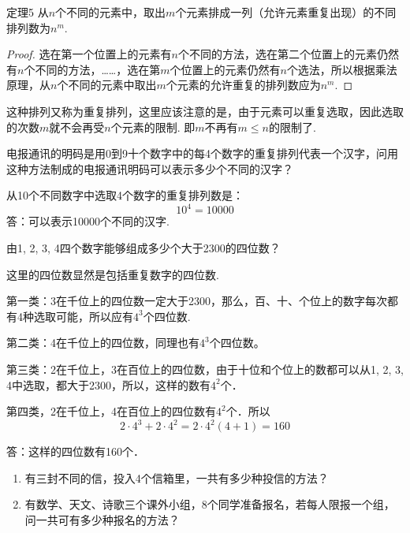 \begin{blk}
{定理5} 从$n$个不同的元素中，取出$m$个元素排成一列（允许元素重复出现）的不同排列数为$n^m$.
\end{blk}

\begin{proof}
    选在第一个位置上的元素有$n$个不同的方法，选在第二个位置上的元素仍然有$n$个不同的方法，……，选在第$m$个位置上的元素仍然有$n$个选法，所以根据乘法原理，从$n$个不同的元素中取出$m$个元素的允许重复的排列数应为$n^m$.
\end{proof}

这种排列又称为重复排列，这里应该注意的是，由于元素可以重复选取，因此选取的次数$m$就不会再受$n$个元素的限制. 即$m$不再有$m\le n$的限制了.

\begin{example}
    电报通讯的明码是用0到9十个数字中的每4个数字的重复排列代表一个汉字，问用这种方法制成的电报通讯明码可以表示多少个不同的汉字？
\end{example}

\begin{solution}
    从10个不同数字中选取4个数字的重复排列数是：
\[10^4=10000\]
答：可以表示10000个不同的汉字.
\end{solution}

\begin{example}
    由1, 2, 3, 4四个数字能够组成多少个大于2300的四位数？
\end{example}

\begin{solution}
    这里的四位数显然是包括重复数字的四位数.

第一类：3在千位上的四位数一定大于2300，那么，百、十、个位上的数字每次都有4种选取可能，所以应有$4^3$个四位数.

第二类：4在千位上的四位数，同理也有$4^3$个四位数。

第三类：2在千位上，3在百位上的四位数，由于十位和个位上的数都可以从1, 2, 3, 4中选取，都大于2300，所以，这样的数有$4^2$个．

第四类，2在千位上，4在百位上的四位数有$4^2$个．所以
\[2\cdot 4^3+2\cdot 4^2=2\cdot 4^2(4+1)=160\]

答：这样的四位数有160个．
\end{solution}

\begin{ex}
    \begin{enumerate}
\item 有三封不同的信，投入4个信箱里，一共有多少种投信的方法？
\item 有数学、天文、诗歌三个课外小组，8个同学准备报名，若每人限报一个组，问一共可有多少种报名的方法？
    \end{enumerate}
\end{ex}

